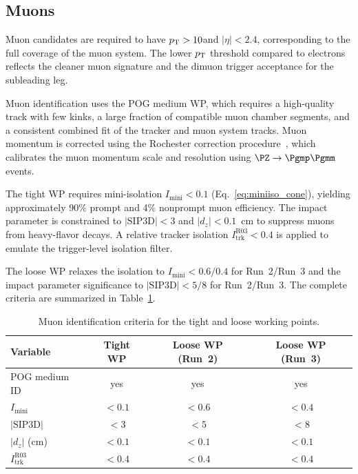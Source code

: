 \subsection{Muons}
\label{ssec:muons}

Muon candidates are required to have $p_{\mathrm{T}} > 10$\GeV and $|\eta| < 2.4$, corresponding to the full coverage of the muon system. The lower $p_{\mathrm{T}}$ threshold compared to electrons reflects the cleaner muon signature and the dimuon trigger acceptance for the subleading leg.

Muon identification uses the POG medium WP, which requires a high-quality track with few kinks, a large fraction of compatible muon chamber segments, and a consistent combined fit of the tracker and muon system tracks. Muon momentum is corrected using the Rochester correction procedure~\cite{Bodek:2012id}, which calibrates the muon momentum scale and resolution using $\PZ \to \Pgmp\Pgmm$ events.

The tight WP requires mini-isolation $I_\text{mini} < 0.1$ (Eq.~\ref{eq:miniiso_cone}), yielding approximately 90\% prompt and 4\% nonprompt muon efficiency. The impact parameter is constrained to $|\text{SIP3D}| < 3$ and $|d_z| < 0.1$~cm to suppress muons from heavy-flavor decays. A relative tracker isolation $I_\text{trk}^\text{R03} < 0.4$ is applied to emulate the trigger-level isolation filter.

The loose WP relaxes the isolation to $I_\text{mini} < 0.6/0.4$ for Run~2/Run~3 and the impact parameter significance to $|\text{SIP3D}| < 5/8$ for Run~2/Run~3. The complete criteria are summarized in Table~\ref{tab:muon_id}.

\begin{table}[htbp]
\centering
\caption{Muon identification criteria for the tight and loose working points.}
\label{tab:muon_id}
\small
\begin{tabular}{lccc}
\hline\hline
Variable & Tight WP & Loose WP (Run~2) & Loose WP (Run~3) \\
\hline
POG medium ID & yes & yes & yes \\
$I_\text{mini}$ & $<0.1$ & $<0.6$ & $<0.4$ \\
$|\text{SIP3D}|$ & $<3$ & $<5$ & $<8$ \\
$|d_z|$ (cm) & $<0.1$ & $<0.1$ & $<0.1$ \\
$I_\text{trk}^\text{R03}$ & $<0.4$ & $<0.4$ & $<0.4$ \\
\hline\hline
\end{tabular}
\end{table}


